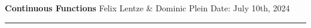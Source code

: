 \documentclass[10pt,a4paper,usenglish]{article}
\newcommand{\subject}{Continuous Functions}
\newcommand{\authors}{Felix Lentze \& Dominic Plein}
\newcommand{\experimentdate}{July 10th, 2024}
\begin{document}
\setlength{\abovedisplayskip}{0.2em}

\thispagestyle{plain} %

\vspace*{-2cm}

\begin{FlushLeft}
    \LARGE \textbf{\subject} \vspace{1mm}\linebreak
    \normalsize	\authors \vspace{1mm}\linebreak
    \small Date: \experimentdate

    \textcolor{heidelberg-red}{\rule{\linewidth}{1mm}}
\end{FlushLeft}

\tableofcontents
\pagebreak

\pagebreak

\pagebreak

\pagebreak

\end{document}
